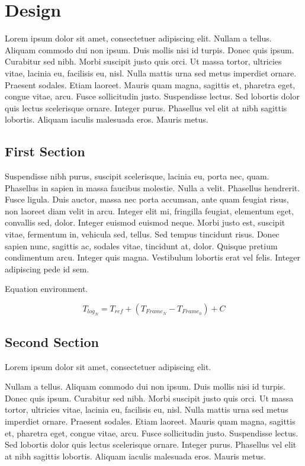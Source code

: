\chapter{Design}
\label{c:chapter2} Lorem ipsum dolor sit amet, consectetuer adipiscing elit.
Nullam a tellus. Aliquam commodo dui non ipsum. Duis mollis nisi id turpis.
Donec quis ipsum. Curabitur sed nibh. Morbi suscipit justo quis orci. Ut massa
tortor, ultricies vitae, lacinia eu, facilisis eu, nisl. Nulla mattis urna sed
metus imperdiet ornare. Praesent sodales. Etiam laoreet. Mauris quam magna,
sagittis et, pharetra eget, congue vitae, arcu. Fusce sollicitudin justo.
Suspendisse lectus. Sed lobortis dolor quis lectus scelerisque ornare. Integer
purus. Phasellus vel elit at nibh sagittis lobortis. Aliquam iaculis malesuada
eros. Mauris metus.

\section{First Section}
\label{st:problemstatement} Suspendisse nibh purus, suscipit scelerisque,
lacinia eu, porta nec, quam. Phasellus in sapien in massa faucibus molestie.
Nulla a velit. Phasellus hendrerit. Fusce ligula. Duis auctor, massa nec porta
accumsan, ante quam feugiat risus, non laoreet diam velit in arcu. Integer elit
mi, fringilla feugiat, elementum eget, convallis sed, dolor. Integer euismod
euismod neque. Morbi justo est, suscipit vitae, fermentum in, vehicula sed,
tellus. Sed tempus tincidunt risus. Donec sapien nunc, sagittis ac, sodales
vitae, tincidunt at, dolor. Quisque pretium condimentum arcu. Integer quis
magna. Vestibulum lobortis erat vel felis. Integer adipiscing pede id sem.

Equation environment.

\begin{equation}
\mbox{$T_{log_{N}}$} =
\mbox{$T_{ref}$} + (\mbox{$T_{Frame_{N}}$} - \mbox{$T_{Frame_{0}}$})
+ \mbox{$C$}
\label{eq:log}
\end{equation}

\section{Second Section}
\label{st:discussion} 
Lorem ipsum dolor sit amet, consectetuer adipiscing elit.

Nullam a tellus. Aliquam commodo dui non ipsum. Duis mollis nisi id turpis.
Donec quis ipsum. Curabitur sed nibh. Morbi suscipit justo quis orci. Ut massa
tortor, ultricies vitae, lacinia eu, facilisis eu, nisl. Nulla mattis urna sed
metus imperdiet ornare. Praesent sodales. Etiam laoreet. Mauris quam magna,
sagittis et, pharetra eget, congue vitae, arcu. Fusce sollicitudin justo.
Suspendisse lectus. Sed lobortis dolor quis lectus scelerisque ornare. Integer
purus. Phasellus vel elit at nibh sagittis lobortis. Aliquam iaculis malesuada
eros. Mauris metus.

